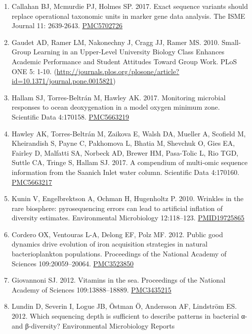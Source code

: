 \documentclass[]{article}
\begin{document}
\begin{enumerate}
\def\labelenumi{\arabic{enumi}.}
\item
  Callahan BJ, Mcmurdie PJ, Holmes SP. 2017. Exact sequence variants
  should replace operational taxonomic units in marker gene data
  analysis. The ISME Journal 11: 2639-2643.
  \href{https://www.ncbi.nlm.nih.gov/pubmed/28731476}{PMC5702726}
\item
  Gaudet AD, Ramer LM, Nakonechny J, Cragg JJ, Ramer MS. 2010.
  Small-Group Learning in an Upper-Level University Biology Class
  Enhances Academic Performance and Student Attitudes Toward Group Work.
  PLoS ONE 5: 1-10.
  (\url{http://journals.plos.org/plosone/article?id=10.1371/journal.pone.0015821})
\item
  Hallam SJ, Torres-Beltrán M, Hawley AK. 2017. Monitoring microbial
  responses to ocean deoxygenation in a model oxygen minimum zone.
  Scientific Data 4:170158.
  \href{https://www.ncbi.nlm.nih.gov/pmc/articles/PMC5663219/}{PMC5663219}
\item
  Hawley AK, Torres-Beltrán M, Zaikova E, Walsh DA, Mueller A, Scofield
  M, Kheirandish S, Payne C, Pakhomova L, Bhatia M, Shevchuk O, Gies EA,
  Fairley D, Malfatti SA, Norbeck AD, Brewer HM, Pasa-Tolic L, Rio TGD,
  Suttle CA, Tringe S, Hallam SJ. 2017. A compendium of multi-omic
  sequence information from the Saanich Inlet water column. Scientific
  Data 4:170160.
  \href{https://www.ncbi.nlm.nih.gov/pubmed/29087368}{PMC5663217}
\item
  Kunin V, Engelbrektson A, Ochman H, Hugenholtz P. 2010. Wrinkles in
  the rare biosphere: pyrosequencing errors can lead to artificial
  inflation of diversity estimates. Environmental Microbiology
  12:118--123.
  \href{https://www.ncbi.nlm.nih.gov/pubmed/19725865}{PMID19725865}
\item
  Cordero OX, Ventouras L-A, Delong EF, Polz MF. 2012. Public good
  dynamics drive evolution of iron acquisition strategies in natural
  bacterioplankton populations. Proceedings of the National Academy of
  Sciences 109:20059--20064.
  \href{https://www.ncbi.nlm.nih.gov/pubmed/23169633}{PMC3523850}
\item
  Giovannoni SJ. 2012. Vitamins in the sea. Proceedings of the National
  Academy of Sciences 109:13888--18889.
  \href{https://www.ncbi.nlm.nih.gov/pubmed/22891350}{PMC3435215}
\item
  Lundin D, Severin I, Logue JB, Östman Ö, Andersson AF, Lindström ES.
  2012. Which sequencing depth is sufficient to describe patterns in
  bacterial α- and β-diversity? Environmental Microbiology Reports

\end{enumerate}
\end{document}
